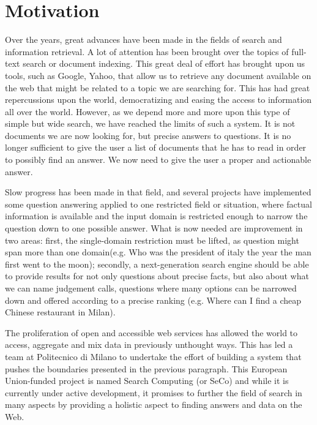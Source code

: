 \chapter{Motivation} %
\label{cha:motivation}

Over the years, great advances have been made in the fields of search and information retrieval. A lot of attention has been brought over the topics of full-text search or document indexing. This great deal of effort has brought upon us tools, such as Google, Yahoo, that allow us to retrieve any document available on the web that might be related to a topic we are searching for. This has had great repercussions upon the world, democratizing and easing the access to information all over the world. However, as we depend more and more upon this type of simple but wide search, we have reached the limits of such a system. It is not documents we are now looking for, but precise answers to questions. It is no longer sufficient to give the user a list of documents that he has to read in order to possibly find an answer. We now need to give the user a proper and actionable answer.

Slow progress has been made in that field, and several projects have implemented some question answering applied to one restricted field or situation, where factual information is available and the input domain is restricted enough to narrow the question down to one possible answer. What is now needed are improvement in two areas: first, the single-domain restriction must be lifted, as question might span more than one domain(e.g. Who was the president of italy the year the man first went to the moon); secondly, a next-generation search engine should be able to provide results for not only questions about precise facts, but also about what we can name judgement calls, questions where many options can be narrowed down and offered according to a precise ranking (e.g. Where can I find a cheap Chinese restaurant in Milan).

The proliferation of open and accessible web services has allowed the world to access, aggregate and mix data in previously unthought ways. This has led a team at Politecnico di Milano to undertake the effort of building a system that pushes the boundaries presented in the previous paragraph. This European Union-funded project is named Search Computing (or SeCo) and while it is currently under active development, it promises to further the field of search in many aspects by providing a holistic aspect to finding answers and data on the Web.


